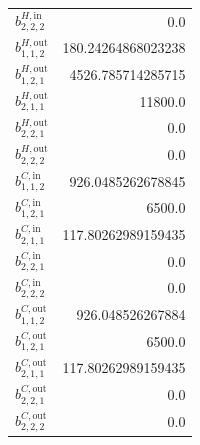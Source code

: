 \documentclass{article}%
\begin{document}
\begin{multicols*}{3}
\begin{supertabular}{lr}
	$b_{2,2,2}^{H,\text{in}}$ & 0.0 \\%
	$b_{1,1,2}^{H,\text{out}}$ & 180.24264868023238 \\%
	$b_{1,2,1}^{H,\text{out}}$ & 4526.785714285715 \\%
	$b_{2,1,1}^{H,\text{out}}$ & 11800.0 \\%
	$b_{2,2,1}^{H,\text{out}}$ & 0.0 \\%
	$b_{2,2,2}^{H,\text{out}}$ & 0.0 \\%
	$b_{1,1,2}^{C,\text{in}}$ & 926.0485262678845 \\%
	$b_{1,2,1}^{C,\text{in}}$ & 6500.0 \\%
	$b_{2,1,1}^{C,\text{in}}$ & 117.80262989159435 \\%
	$b_{2,2,1}^{C,\text{in}}$ & 0.0 \\%
	$b_{2,2,2}^{C,\text{in}}$ & 0.0 \\%
	$b_{1,1,2}^{C,\text{out}}$ & 926.048526267884 \\%
	$b_{1,2,1}^{C,\text{out}}$ & 6500.0 \\%
	$b_{2,1,1}^{C,\text{out}}$ & 117.80262989159435 \\%
	$b_{2,2,1}^{C,\text{out}}$ & 0.0 \\%
	$b_{2,2,2}^{C,\text{out}}$ & 0.0 \\%
\end{supertabular}%
\end{multicols*}%
\end{document}
